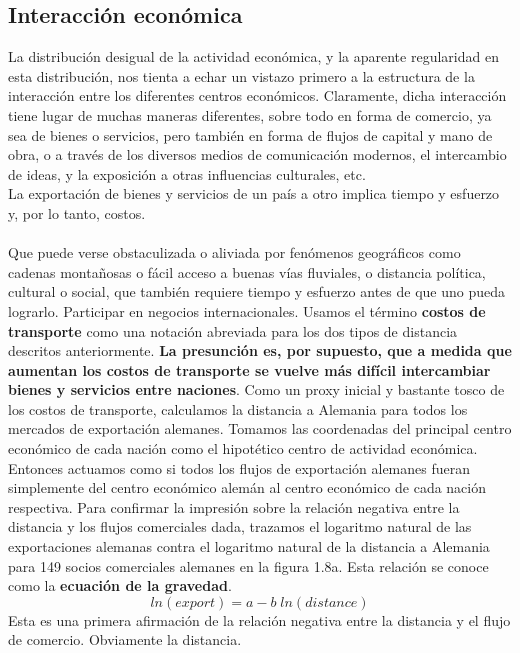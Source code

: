 \begin{multicols}{2}
\section{Interacción económica}
    La distribución desigual de la actividad económica, y la aparente regularidad en esta distribución, nos tienta a echar un vistazo primero a la estructura de la interacción entre los diferentes centros económicos. Claramente, dicha interacción tiene lugar de muchas maneras diferentes, sobre todo en forma de comercio, ya sea de bienes o servicios, pero también en forma de flujos de capital y mano de obra, o a través de los diversos medios de comunicación modernos, el intercambio de ideas, y la exposición a otras influencias culturales, etc.\\
    La exportación de bienes y servicios de un país a otro implica tiempo y esfuerzo y, por lo tanto, costos.\\\\
    Que puede verse obstaculizada o aliviada por fenómenos geográficos como cadenas montañosas o fácil acceso a buenas vías fluviales, o distancia política, cultural o social, que también requiere tiempo y esfuerzo antes de que uno pueda lograrlo. Participar en negocios internacionales. Usamos el término \textbf{costos de transporte} como una notación abreviada para los dos tipos de distancia descritos anteriormente. \textbf{La presunción es, por supuesto, que a medida que aumentan los costos de transporte se vuelve más difícil intercambiar bienes y servicios entre naciones}. Como un proxy inicial y bastante tosco de los costos de transporte, calculamos la distancia a Alemania para todos los mercados de exportación alemanes. Tomamos las coordenadas del principal centro económico de cada nación como el hipotético centro de actividad económica. Entonces actuamos como si todos los flujos de exportación alemanes fueran simplemente del centro económico alemán al centro económico de cada nación respectiva. Para confirmar la impresión sobre la relación negativa entre la distancia y los flujos comerciales dada, trazamos el logaritmo natural de las exportaciones alemanas contra el logaritmo natural de la distancia a Alemania para 149 socios comerciales alemanes en la figura 1.8a. Esta relación se conoce como la \textbf{ecuación de la gravedad}.
    $$ln(export) = a - b\; ln(distance)$$
   Esta es una primera afirmación de la relación negativa entre la distancia y el flujo de comercio. Obviamente la distancia.\\

\end{multicols}
